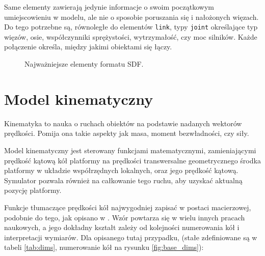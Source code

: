 	Same elementy zawierają jedynie informacje o swoim początkowym umiejscowieniu w modelu, ale nie o sposobie poruszania się i nałożonych więzach.
	Do tego potrzebne są, równoległe do elementów \texttt{link}, typy \texttt{joint} określające typ więzów, osie, współczynniki sprężystości, wytrzymałość, czy moc silników.
	Każde połączenie określa, między jakimi obiektami się łączy.
	
	\begin{figure}[H]
	\caption{Najważniejsze elementy formatu SDF.}
	\label{fig:sdf_dir}
	\end{figure} 
	
\section{Model kinematyczny}
	\label{sec:pseudovelma}
	Kinematyka to nauka o ruchach obiektów na podstawie nadanych wektorów prędkości.
	Pomija ona takie aspekty jak masa, moment bezwładności, czy siły.
	
	Model kinematyczny jest sterowany funkcjami matematycznymi, 
	zamieniającymi prędkość kątową kół platformy na prędkości transwersalne geometrycznego środka platformy w układzie współrzędnych lokalnych, oraz jego prędkość kątową. 
	Symulator pozwala również na całkowanie tego ruchu, aby uzyskać aktualną pozycję platformy.
	
	Funkcje tłumaczące prędkości kół najwygodniej zapisać w postaci macierzowej, podobnie do tego, jak opisano w \cite{wheels}. 
	Wzór powtarza się w wielu innych pracach naukowych, a jego dokładny kształt zależy od kolejności numerowania kół i interpretacji wymiarów.
	Dla opisanego tutaj przypadku, (stałe zdefiniowane są w tabeli \ref{tab:dims}, numerowanie kół na rysunku \ref{fig:base_dims}):
	
